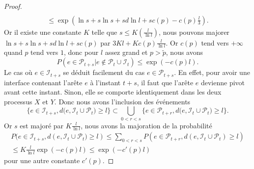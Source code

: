 \documentclass[titlepage,a4paper,12pt]{article}
\newcounter{th}
\begin{document}
\begin{proof}
\begin{multline*}
\\ \leqslant \exp(\ln s+s\ln s+sd\ln l +sc(p) -c(p)\frac{l}{3}).
\end{multline*}
Or il existe une constante $K$ telle que $\displaystyle s \leqslant K(\frac{l}{\ln l})$, nous pouvons majorer $\ln s+s\ln s+sd\ln l +sc(p)$ par $\displaystyle 3Kl+Kc(p)\frac{l}{\ln l}$. Or $c(p)$ tend vers $+\infty$ quand $p$ tend vers $1$, donc pour $l$ assez grand et $p>\widetilde{p}$, nous avons 
$$P(e\in \mathcal{P}_{t+s}|e\notin \mathcal{P}_t\cup \mathcal{I}_t) \leqslant \exp(-c(p)l).
$$
Le cas où $e\in \mathcal{I}_{t+s}$ se déduit facilement du cas $e\in \mathcal{P}_{t+s}$. En effet, pour avoir une interface contenant l'arête $e$ à l'instant $t+s$, il faut que l'arête $e$ devienne pivot avant cette instant. Sinon, elle se comporte identiquement dans les deux processus $X$ et $Y$. Donc nous avons l'inclusion des événements 
$$ \big\{ e\in \mathcal{I}_{t+s}, d(e,\mathcal{I}_t \cup \mathcal{P}_{t}\big) \geqslant l\} \subset \bigcup_{0<r<s}\big\{ e\in \mathcal{P}_{t+r}, d(e,\mathcal{I}_t \cup \mathcal{P}_{t}\big) \geqslant l\}.
$$
Or $s$ est majoré par $\displaystyle K\frac{l}{\ln l}$, nous avons la majoration de la probabilité
\begin{multline*} P(e\in \mathcal{I}_{t+s}, d(e,\mathcal{I}_t \cup \mathcal{P}_{t}\big) \geqslant l) \leqslant \sum_{0<r<s} P(e\in \mathcal{P}_{t+r}, d(e,\mathcal{I}_t \cup \mathcal{P}_{t})\geqslant l) \\ \leqslant K\frac{l}{\ln l}\exp(-c(p)l)\leqslant \exp(-c'(p)l)
\end{multline*}
pour une autre constante $c'(p)$. 
\end{proof}
\end{document}
